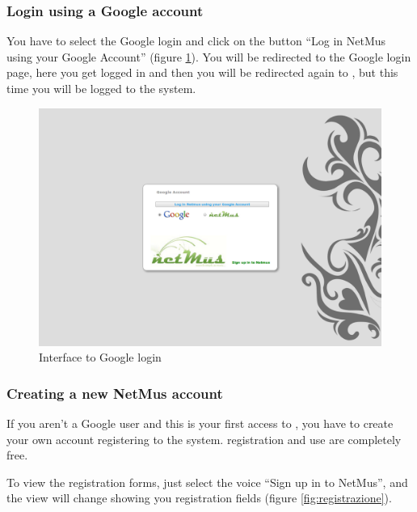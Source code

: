 \subsubsection*{Login using a Google account}
You have to select the Google login and click on the button ``Log in
NetMus using your Google Account'' (figure \ref{fig:loginGoogle}). You will be
redirected to the Google login page, here you get logged in and then you will be redirected again to
, but this time you will be logged to the system.\\

\begin{figure}[!htbp]
  \centering
  \includegraphics[width=14cm]{img/MU/loginGoogle.png}
\caption{Interface to Google login}
\label{fig:loginGoogle}
\end{figure}

\subsubsection*{Creating a new NetMus account}
If you aren't a Google user and this is your first access to , you
have to create your own account registering to the system.
 registration and use are completely free.

To view the registration forms, just select the voice ``Sign up in to NetMus'',
and the view will change showing you registration fields (figure
\ref{fig:registrazione}).

